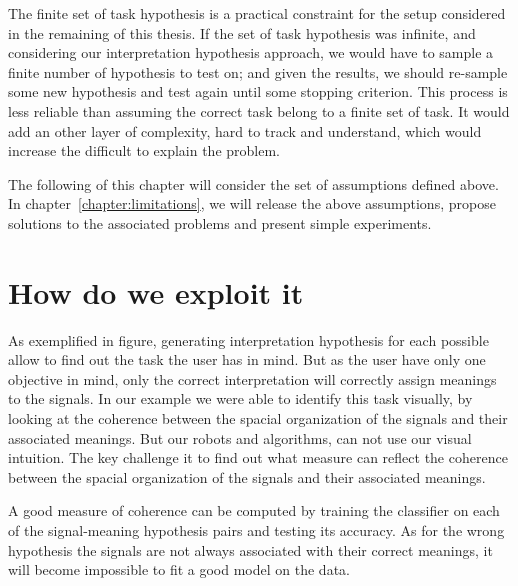 The finite set of task hypothesis is a practical constraint for the setup considered in the remaining of this thesis. If the set of task hypothesis was infinite, and considering our interpretation hypothesis approach, we would have to sample a finite number of hypothesis to test on; and given the results, we should re-sample some new hypothesis and test again until some stopping criterion. This process is less reliable than assuming the correct task belong to a finite set of task. It would add an other layer of complexity, hard to track and understand, which would increase the difficult to explain the problem.

The following of this chapter will consider the set of assumptions defined above. In chapter~\ref{chapter:limitations}, we will release the above assumptions, propose solutions to the associated problems and present simple experiments.

\section{How do we exploit it}

As exemplified in figure, generating interpretation hypothesis for each possible allow to find out the task the user has in mind. But as the user have only one objective in mind, only the correct interpretation will correctly assign meanings to the signals. In our example we were able to identify this task visually, by looking at the coherence between the spacial organization of the signals and their associated meanings. But our robots and algorithms, can not use our visual intuition. The key challenge it to find out what measure can reflect the coherence between the spacial organization of the signals and their associated meanings.

A good measure of coherence can be computed by training the classifier on each of the signal-meaning hypothesis pairs and testing its accuracy. As for the wrong hypothesis the signals are not always associated with their correct meanings, it will become impossible to fit a good model on the data. 




